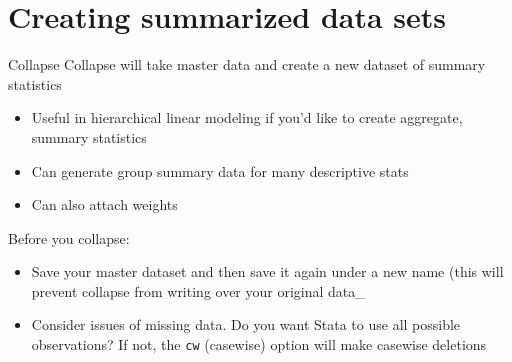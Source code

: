 \documentclass[table,smaller]{beamer}
\begin{document}
\section{Creating summarized data sets}
\label{sec-7}

\begin{frame}[fragile,label=sec-7-1]{Collapse}
 Collapse will take master data and create a new dataset of summary statistics
\begin{itemize}
\item Useful in hierarchical linear modeling if you'd like to create aggregate, summary statistics
\item Can generate group summary data for many  descriptive stats
\item Can also attach weights
\end{itemize}

Before you collapse:
\begin{itemize}
\item Save your master dataset and then save it again under a new name (this will prevent collapse from writing over your original data\_
\item Consider issues of missing data. Do you want Stata to use all possible observations? If not, the \verb~cw~ (casewise) option will make casewise deletions
\end{itemize}
\end{frame}
\end{document}
